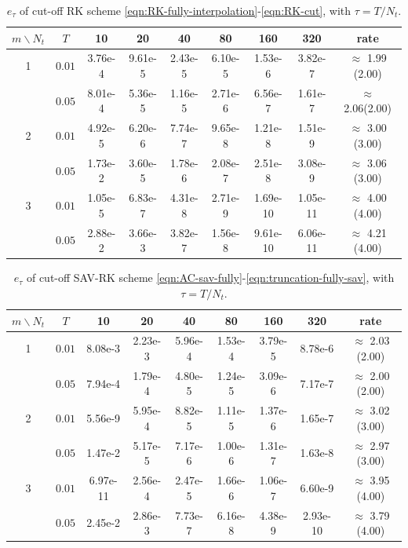 \documentclass[a4paper, oneside]{book}
\begin{document}
\begin{table}[h]
\centering
\caption{$e_\tau$ of cut-off RK scheme \eqref{eqn:RK-fully-interpolation}-\eqref{eqn:RK-cut}, with $\tau=T/N_t$.}
\label{table:ex1_time}
\begin{tabular}{|c|c|cccccc|c|}
\hline
$m\backslash N_t$  & $T$   &10 &20 &40 &80 &160 & 320 & rate \\
\hline
1   &   $ 0.01$& 3.76e-4& 9.61e-5& 2.43e-5& 6.10e-5& 1.53e-6& 3.82e-7 &$\approx$ 1.99 (2.00)    \\
    &   $ 0.05$ & 8.01e-4& 5.36e-5& 1.16e-5& 2.71e-6& 6.56e-7& 1.61e-7 &$\approx$ 2.06(2.00)   \\
\hline
2   &   $ 0.01$& 4.92e-5& 6.20e-6& 7.74e-7& 9.65e-8& 1.21e-8& 1.51e-9 &$\approx$ 3.00 (3.00)    \\
    &   $ 0.05$ & 1.73e-2& 3.60e-5& 1.78e-6& 2.08e-7& 2.51e-8& 3.08e-9 &$\approx$ 3.06 (3.00)    \\
\hline
3   &   $0.01$& 1.05e-5& 6.83e-7& 4.31e-8& 2.71e-9& 1.69e-10& 1.05e-11 &$\approx$ 4.00 (4.00)    \\
    &   $0.05$ & 2.88e-2& 3.66e-3& 3.82e-7& 1.56e-8& 9.61e-10& 6.06e-11 &$\approx$ 4.21 (4.00)    \\
\hline
\end{tabular}
\end{table}




 \begin{table}[!h]
\centering
\caption{$e_\tau$ of cut-off SAV-RK scheme \eqref{eqn:AC-sav-fully}-\eqref{eqn:truncation-fully-sav}, with $\tau=T/N_t$.}
\label{table:ex1_time-sav}
\begin{tabular}{|c|c|cccccc|c|}
\hline
$m\backslash N_t$  & $T$   &10 &20 &40 &80 &160 & 320 & rate \\
\hline
1   &   $0.01$& 8.08e-3& 2.23e-3& 5.96e-4& 1.53e-4& 3.79e-5& 8.78e-6 &$\approx$ 2.03 (2.00)    \\
    &   $0.05$& 7.94e-4& 1.79e-4& 4.80e-5& 1.24e-5& 3.09e-6& 7.17e-7 &$\approx$ 2.00 (2.00)   \\
\hline
2   &   $0.01$& 5.56e-9& 5.95e-4& 8.82e-5& 1.11e-5& 1.37e-6& 1.65e-7 &$\approx$ 3.02 (3.00)    \\
    &   $0.05$& 1.47e-2& 5.17e-5& 7.17e-6& 1.00e-6& 1.31e-7& 1.63e-8 &$\approx$ 2.97 (3.00)    \\
\hline
3   &   $0.01$& 6.97e-11& 2.56e-4& 2.47e-5& 1.66e-6& 1.06e-7& 6.60e-9 &$\approx$ 3.95 (4.00)    \\
    &   $0.05$& 2.45e-2& 2.86e-3& 7.73e-7& 6.16e-8& 4.38e-9& 2.93e-10 &$\approx$ 3.79 (4.00)    \\
\hline
\end{tabular}
\end{table}
\end{document}
